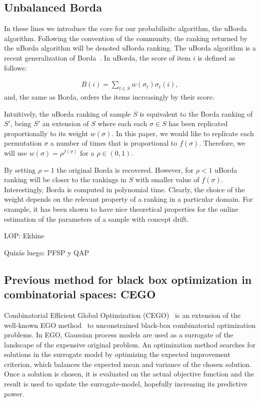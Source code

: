 \documentclass[runningheads]{llncs}
\begin{document}
\subsection{Unbalanced Borda}\label{sec:uborda}
In these lines we introduce the core for our probabilisitc algorithm, the uBorda algorithm. Following the convention of the community, the ranking returned by the uBorda algorithm will be denoted uBorda ranking. The uBorda algorithm is a recent generalization of Borda~\cite{}. In uBorda, the score of item $i$ is defined as follows:

\begin{equation}
\begin{split}
B(i) =  \sum_{t\in S}  w(\sigma_t) \sigma_t(i),
\end{split}
\label{eq:uborda_score}
\end{equation}
and, the same as Borda, orders the items increasingly by their score. 

Intuitively, the uBorda ranking of sample $S$ is equivalent to the Borda ranking of $S'$, being $S'$ an extension of $S$ where each each $\sigma\in S$ has been replicated proportionally to its weight $w(\sigma)$. In this paper, we would like to replicate each permutation $\sigma$ a number of times that is proportional to $f(\sigma)$. Therefore, we will use $w(\sigma)=\rho^{f(\sigma)}$ for a $\rho\in(0,1)$. 

By setting $\rho=1$ the original Borda is recovered. However, for $\rho<1$ uBorda ranking will be closer to the rankings in $S$ with smaller value of $f(\sigma)$. Interestingly, Borda is computed in polynomial time. Clearly, the choice of the weight depends on the relevant property of a ranking in a particular domain. For example, it has been shown to have nice theoretical properties for the online estimation of the parameters of a sample with concept drift. 





LOP: Ekhine

Quizás luego: PFSP y QAP

\subsection{Previous method for black box optimization in combinatorial spaces: CEGO}



Combinatorial Efficient Global Optimization
(CEGO)~\citep{ZaeStoFriFisNauBar2014} is an extension of the well-known EGO
method~\citep{JonSchWel98go} to unconstrained black-box combinatorial
optimization problems. In EGO, Gaussian process models are used as a surrogate
of the landscape of the expensive original problem. An optimization method
searches for solutions in the surrogate model by optimizing the expected
improvement criterion, which balances the expected mean and variance of the
chosen solution. Once a solution is chosen, it is evaluated on the actual
objective function and the result is used to update the surrogate-model,
hopefully increasing its predictive power.
\end{document}
